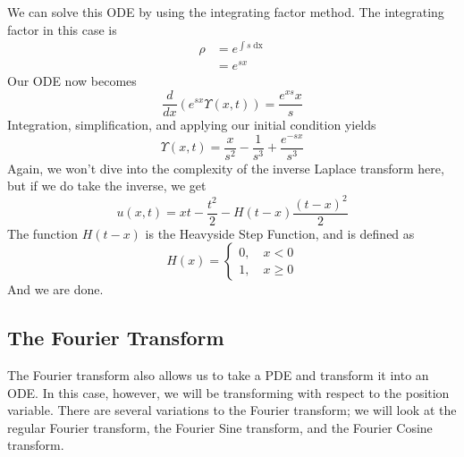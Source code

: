 We can solve this ODE by using the integrating factor method. The integrating factor in this case
is
\begin{align*}
\rho &= e^{\int s\mathop{dx}}\\
&= e^{sx}
\end{align*}
Our ODE now becomes
\[
\frac{d}{dx}(e^{sx}\Upsilon(x,t)) = \frac{e^{xs}x}{s}
\]
Integration, simplification, and applying our initial condition yields
\[
\Upsilon(x,t) = \frac{x}{s^{2}}-\frac{1}{s^{3}} + \frac{e^{-sx}}{s^{3}}
\]
Again, we won't dive into the complexity of the inverse Laplace transform here, but if we do take
the inverse, we get
\[
u(x,t) = xt - \frac{t^{2}}{2} - H(t-x)\frac{(t-x)^{2}}{2}
\]
The function $H(t-x)$ is the Heavyside Step Function, and is defined as
\[
H(x) =
\begin{cases*}
0,\quad x<0\\
1,\quad x\geq 0
\end{cases*}
\]
And we are done.
\newpage



\subsection{The Fourier Transform}
\indent The Fourier transform also allows us to take a PDE and transform it into an ODE. In this case,
however, we will be transforming with respect to the position variable. There are several variations to
the Fourier transform; we will look at the regular Fourier transform, the Fourier Sine transform, and the
Fourier Cosine transform.
